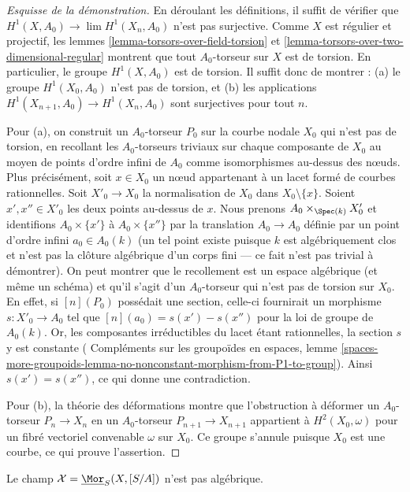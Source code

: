 \begin{proof}[Esquisse de la démonstration]
En déroulant les définitions, il suffit de vérifier que
$H^1(X, A_0) \to \lim H^1(X_n, A_0)$ n'est pas surjective.
Comme $X$ est régulier et projectif, les
lemmes \ref{lemma-torsors-over-field-torsion} et
\ref{lemma-torsors-over-two-dimensional-regular}
montrent que tout $A_0$-torseur sur $X$ est
de torsion. En particulier, le groupe $H^1(X, A_0)$ est de torsion.
Il suffit donc de montrer :
(a) le groupe $H^1(X_0, A_0)$ n'est pas de torsion, et
(b) les applications $H^1(X_{n + 1}, A_0) \to H^1(X_n, A_0)$ sont surjectives pour tout $n$.

\medskip\noindent
Pour (a), on construit un $A_0$-torseur $P_0$ sur la courbe nodale $X_0$
qui n'est pas de torsion, en recollant les $A_0$-torseurs triviaux sur chaque
composante de $X_0$ au moyen de points d'ordre infini de $A_0$ comme
isomorphismes au-dessus des nœuds. Plus précisément, soit $x \in X_0$ un nœud
appartenant à un lacet formé de courbes rationnelles.
Soit $X'_0 \to X_0$ la normalisation de $X_0$ dans $X_0 \setminus \{x\}$.
Soient $x', x'' \in X'_0$ les deux points au-dessus de $x$.
Nous prenons $A_0 \times_{\Spec(k)} X'_0$ et identifions
$A_0 \times \{x'\}$ à $A_0 \times \{x''\}$ par la translation
$A_0 \to A_0$ définie par un point d'ordre infini $a_0 \in A_0(k)$
(un tel point existe puisque $k$ est algébriquement clos et n'est pas la
clôture algébrique d'un corps fini --- ce fait n'est pas trivial à démontrer).
On peut montrer que le recollement est un espace algébrique (et même
un schéma) et qu'il s'agit d'un $A_0$-torseur qui n'est pas de torsion sur $X_0$.
En effet, si $[n](P_0)$ possédait une section, celle-ci fournirait un morphisme
$s : X'_0 \to A_0$ tel que
$[n](a_0) = s(x') - s(x'')$ pour la loi de groupe de $A_0(k)$. Or,
les composantes irréductibles du lacet étant rationnelles, la section $s$
y est constante (
Compléments sur les groupoïdes en espaces, lemme
\ref{spaces-more-groupoids-lemma-no-nonconstant-morphism-from-P1-to-group}).
Ainsi $s(x') = s(x'')$, ce qui donne une contradiction.

\medskip\noindent
Pour (b), la théorie des déformations montre que l'obstruction à déformer un $A_0$-torseur $P_n \to X_n$ en un $A_0$-torseur
$P_{n + 1} \to X_{n + 1}$ appartient à $H^2(X_0, \omega)$
pour un fibré vectoriel convenable $\omega$ sur $X_0$.
Ce groupe s'annule puisque $X_0$ est une courbe, ce qui prouve l'assertion.
\end{proof}

\begin{proposition}
\label{proposition-nonalghomstack}
Le champ $\mathcal{X} = \underline{\Mor}_S(X, [S/A])$ n'est pas algébrique.
\end{proposition}

